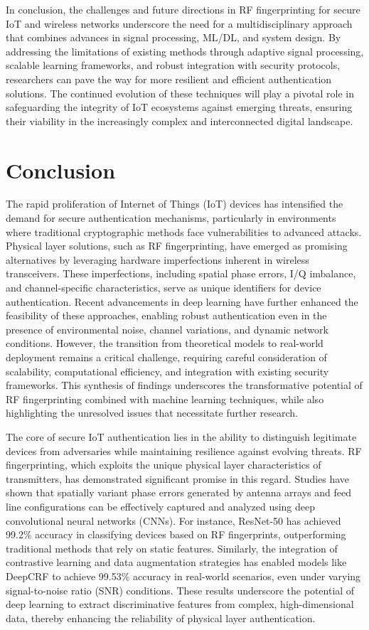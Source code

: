 \documentclass[conference]{IEEEtran}
\begin{document}
In conclusion, the challenges and future directions in RF fingerprinting for secure IoT and wireless networks underscore the need for a multidisciplinary approach that combines advances in signal processing, ML/DL, and system design. By addressing the limitations of existing methods through adaptive signal processing, scalable learning frameworks, and robust integration with security protocols, researchers can pave the way for more resilient and efficient authentication solutions. The continued evolution of these techniques will play a pivotal role in safeguarding the integrity of IoT ecosystems against emerging threats, ensuring their viability in the increasingly complex and interconnected digital landscape.

\section{Conclusion}

The rapid proliferation of Internet of Things (IoT) devices has intensified the demand for secure authentication mechanisms, particularly in environments where traditional cryptographic methods face vulnerabilities to advanced attacks. Physical layer solutions, such as RF fingerprinting, have emerged as promising alternatives by leveraging hardware imperfections inherent in wireless transceivers. These imperfections, including spatial phase errors, I/Q imbalance, and channel-specific characteristics, serve as unique identifiers for device authentication. Recent advancements in deep learning have further enhanced the feasibility of these approaches, enabling robust authentication even in the presence of environmental noise, channel variations, and dynamic network conditions. However, the transition from theoretical models to real-world deployment remains a critical challenge, requiring careful consideration of scalability, computational efficiency, and integration with existing security frameworks. This synthesis of findings underscores the transformative potential of RF fingerprinting combined with machine learning techniques, while also highlighting the unresolved issues that necessitate further research.  

The core of secure IoT authentication lies in the ability to distinguish legitimate devices from adversaries while maintaining resilience against evolving threats. RF fingerprinting, which exploits the unique physical layer characteristics of transmitters, has demonstrated significant promise in this regard. Studies have shown that spatially variant phase errors generated by antenna arrays and feed line configurations can be effectively captured and analyzed using deep convolutional neural networks (CNNs). For instance, ResNet-50 has achieved 99.2\% accuracy in classifying devices based on RF fingerprints, outperforming traditional methods that rely on static features. Similarly, the integration of contrastive learning and data augmentation strategies has enabled models like DeepCRF to achieve 99.53\% accuracy in real-world scenarios, even under varying signal-to-noise ratio (SNR) conditions. These results underscore the potential of deep learning to extract discriminative features from complex, high-dimensional data, thereby enhancing the reliability of physical layer authentication.  
\end{document}
